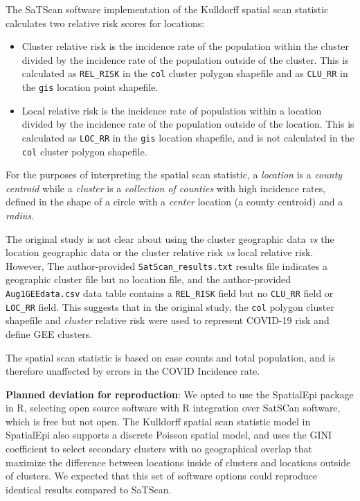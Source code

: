 \documentclass[
]{article}
\providecommand{\tightlist}{%
  \setlength{\itemsep}{0pt}\setlength{\parskip}{0pt}}
\begin{document}
The SaTScan software implementation of the Kulldorff spatial scan
statistic calculates two relative risk scores for locations:

\begin{itemize}
\tightlist
\item
  Cluster relative risk is the incidence rate of the population within
  the cluster divided by the incidence rate of the population outside of
  the cluster. This is calculated as \texttt{REL\_RISK} in the
  \texttt{col} cluster polygon shapefile and as \texttt{CLU\_RR} in the
  \texttt{gis} location point shapefile.
\item
  Local relative risk is the incidence rate of population within a
  location divided by the incidence rate of the population outside of
  the location. This is calculated as \texttt{LOC\_RR} in the
  \texttt{gis} location shapefile, and is not calculated in the
  \texttt{col} cluster polygon shapefile.
\end{itemize}

For the purposes of interpreting the spatial scan statistic, a
\emph{location} is a \emph{county centroid} while a \emph{cluster} is a
\emph{collection of counties} with high incidence rates, defined in the
shape of a circle with a \emph{center} location (a county centroid) and
a \emph{radius}.

The original study is not clear about using the cluster geographic data
\emph{vs} the location geographic data or the cluster relative risk
\emph{vs} local relative risk. However, The author-provided
\texttt{SatScan\_results.txt} results file indicates a geographic
cluster file but no location file, and the author-provided
\texttt{Aug1GEEdata.csv} data table contains a \texttt{REL\_RISK} field
but no \texttt{CLU\_RR} field or \texttt{LOC\_RR} field. This suggests
that in the original study, the \texttt{col} polygon cluster shapefile
and \emph{cluster} relative risk were used to represent COVID-19 risk
and define GEE clusters.

The spatial scan statistic is based on case counts and total population,
and is therefore unaffected by errors in the COVID Incidence rate.

\textbf{Planned deviation for reproduction}: We opted to use the
SpatialEpi package in R, selecting open source software with R
integration over SatSCan software, which is free but not open. The
Kulldorff spatial scan statistic model in SpatialEpi also supports a
discrete Poisson spatial model, and uses the GINI coefficient to select
secondary clusters with no geographical overlap that maximize the
difference between locations inside of clusters and locations outside of
clusters. We expected that this set of software options could reproduce
identical results compared to SaTScan.
\end{document}

